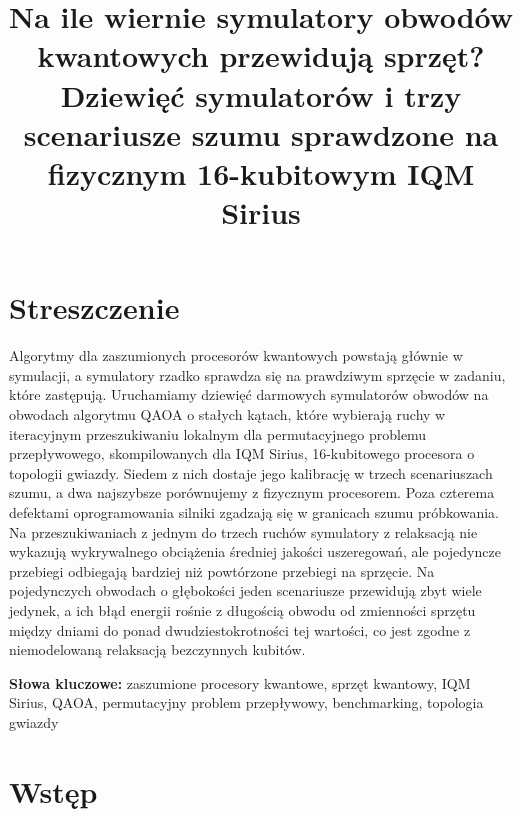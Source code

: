\documentclass{scspaperproc}
\begin{document}
\def\SCSconferencename{Annual Modeling and Simulation Conference}
\def\SCSconferenceacro{ANNSIM'27}
\def\SCSpublicationyear{2027}
\def\SCSconferenceeditors{A. Bany Abdelnabi, J. Jabbour, S. Mustafiz, and R. Idzikowski}
\def\SCSconferencedates{May 17-21}
\def\SCSconferencevenue{Wroc{\l}aw University of Science and Technology, Wroc{\l}aw, Poland}

\author{}
\title{Na ile wiernie symulatory obwodów kwantowych przewidują sprzęt? Dziewięć
symulatorów i trzy scenariusze szumu sprawdzone na fizycznym 16-kubitowym
IQM Sirius}

\maketitle

\section*{Streszczenie}
Algorytmy dla zaszumionych procesorów kwantowych powstają głównie w symulacji,
a symulatory rzadko sprawdza się na prawdziwym sprzęcie w zadaniu, które zastępują.
Uruchamiamy dziewięć darmowych symulatorów obwodów na obwodach algorytmu QAOA
o stałych kątach, które wybierają ruchy w iteracyjnym przeszukiwaniu lokalnym
dla permutacyjnego problemu przepływowego, skompilowanych dla IQM Sirius,
16-kubitowego procesora o topologii gwiazdy. Siedem z nich dostaje jego kalibrację
w trzech scenariuszach szumu, a dwa najszybsze porównujemy
z fizycznym procesorem. Poza czterema defektami oprogramowania silniki zgadzają się
w granicach szumu próbkowania. Na przeszukiwaniach z jednym do trzech ruchów
symulatory z relaksacją nie wykazują wykrywalnego obciążenia średniej jakości
uszeregowań, ale pojedyncze przebiegi odbiegają bardziej niż powtórzone
przebiegi na sprzęcie. Na pojedynczych obwodach o głębokości jeden scenariusze
przewidują zbyt wiele jedynek, a ich błąd energii rośnie z długością obwodu od
zmienności sprzętu między dniami do ponad dwudziestokrotności tej wartości,
co jest zgodne z niemodelowaną relaksacją bezczynnych kubitów.

\textbf{Słowa kluczowe:} zaszumione procesory kwantowe, sprzęt kwantowy, IQM Sirius, QAOA, permutacyjny problem przepływowy, benchmarking, topologia gwiazdy

\section{Wst\k{e}p}
\end{document}
